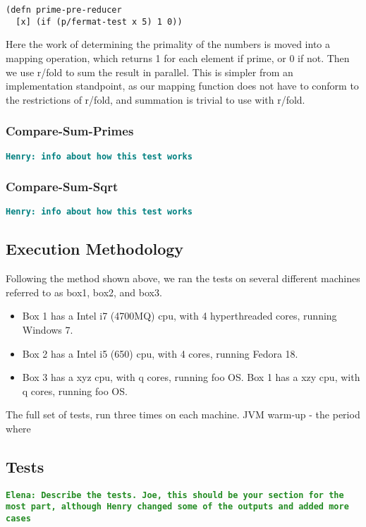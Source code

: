 \documentclass[12pt]{article}
\newcommand{\comment}[1]{{\bf \tt  {#1}}}
\newcommand{\emcomment}[1]{\textcolor{ForestGreen}{\comment{Elena: {#1}}}}
\newcommand{\hfcomment}[1]{\textcolor{Teal}{\comment{Henry: {#1}}}}
\begin{document}
\begin{verbatim}
(defn prime-pre-reducer
  [x] (if (p/fermat-test x 5) 1 0))
\end{verbatim}

Here the work of determining the primality of the numbers is moved into a mapping operation, which returns 1 for each element if prime, or 0 if not. Then we use r/fold to sum the result in parallel. This is simpler from an implementation standpoint, as our mapping function does not have to conform to the restrictions of r/fold, and summation is trivial to use with r/fold.
  
\subsubsection{Compare-Sum-Primes}\label{sec:sum-primes}

 
 \hfcomment{info about how this test works}
 
 \subsubsection{Compare-Sum-Sqrt}\label{sec:sum-sqrt}
 
 \hfcomment{info about how this test works}
 
 \subsection{Execution Methodology}\label{sec:eMethods}
 Following the method shown above, we ran the tests on several different machines referred to as box1, box2, and box3.
 
\begin{itemize}
 \item 
 Box 1 has a Intel i7 (4700MQ) cpu, with 4 hyperthreaded cores, running Windows 7.
 \item
 Box 2 has a Intel i5 (650) cpu, with 4 cores, running Fedora 18.
 \item
 Box 3 has a xyz cpu, with q cores, running foo OS. Box 1 has a xzy cpu, with q cores, running foo OS.
 \end{itemize}
 
The full set of tests, run three times on each machine. JVM warm-up - the period where




\subsection{Tests}\label{sec:tests}
\emcomment{Describe the tests. Joe, this should be your section for the most part, although Henry changed some of the outputs and added more cases}
\end{document}
